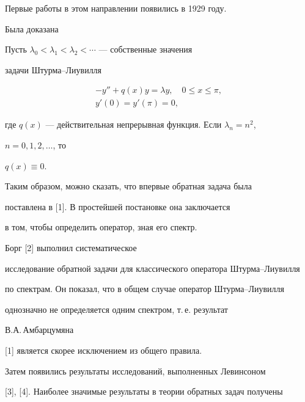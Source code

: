  


Первые работы в этом направлении появились в 1929 году. 


Была доказана 


 


\begin{thmnonum} 


Пусть $\lambda_0<\lambda_1<\lambda_2<\dotsb$ --- собственные значения 


задачи Штурма--Лиувилля 


\begin{gather*} 


-y''+q(x)y=\lambda y,\quad 0\le x\le\pi,\\ 


y'(0)=y'(\pi)=0, 


\end{gather*} 


где $q(x)$ --- действительная непрерывная функция. Если $\lambda_n=n^2$, 


$n=0,1,2,\dotsc$, то 


$q(x)\equiv0$. 


\end{thmnonum} 


 


Таким образом, можно сказать, что впервые обратная задача была 


поставлена в [1]. В простейшей постановке она заключается 


в том, чтобы определить оператор, зная его спектр. 


 


Борг [2] выполнил систематическое 


исследование обратной задачи для классического оператора Штурма--Лиувилля 


по спектрам. Он показал, что в общем случае оператор Штурма--Лиувилля 


однозначно не определяется одним спектром, т.\,е. результат 


В.А.\,Амбарцумяна 


[1] является скорее исключением из общего правила. 


 


Затем появились результаты исследований, выполненных Левинсоном 


[3], [4]. Наиболее значимые результаты в теории обратных задач получены 


